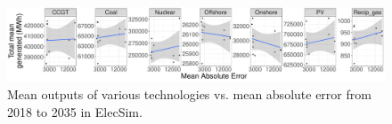 \documentclass[final,3p,times,twocolumn,numbers]{elsarticle}
\begin{document}


\begin{figure}[h]
\includegraphics[width=\columnwidth,natwidth=700,natheight=485]{figures/results/contributed_total_plot.pdf}
\caption{Mean outputs of various technologies vs. mean absolute error from 2018 to 2035 in ElecSim.}
\label{fig:pv_coal_nuclear_offshore_outputs}
\end{figure}
\end{document}
